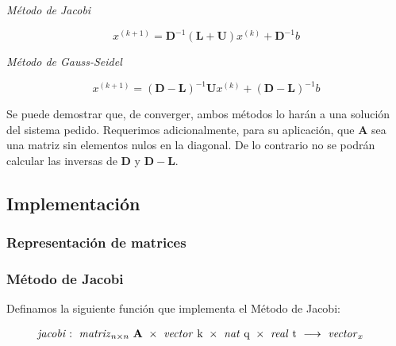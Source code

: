 \vspace{1em}
\begin{center}
    \textit{Método de Jacobi}
\end{center}

\begin{equation} \label{jacobi}
    x^{(k+1)} = \textbf{D}^{-1} (\textbf{L} + \textbf{U}) x^{(k)} + \textbf{D}^{-1} b 
\end{equation}

\vspace{2em}
\begin{center}
    \textit{Método de Gauss-Seidel}
\end{center}

\begin{equation}\label{gauss-seidel}
    x^{(k+1)} = (\mathbf{D} - \mathbf{L})^{-1} \mathbf{U} x^{(k)} + (\mathbf{D} - \mathbf{L})^{-1} b
\end{equation}

\vspace{1em}
Se puede demostrar que, de converger, ambos métodos lo harán a una solución del sistema pedido. Requerimos adicionalmente, para su aplicación, que $\mathbf{A}$ sea una matriz sin elementos nulos en la diagonal. De lo contrario no se podrán calcular las inversas de $\mathbf{D}$ y $\mathbf{D} - \mathbf{L}$.






\vspace{2em}
\subsection{Implementación}


\subsubsection{Representación de matrices}


\vspace{2em}
\subsubsection{Método de Jacobi}
Definamos la siguiente función que implementa el Método de Jacobi:

\begin{align*}
    \text{\textit{jacobi}}&:\ \text{\textit{matriz}}_{n \times n}\ \mathbf{A}\ \times\ \text{\textit{vector} k}\ \times\ \text{\textit{nat} q}\ \times\ \text{\textit{real} t}\
    \longrightarrow\ \text{\textit{vector}}_x
\end{align*}


